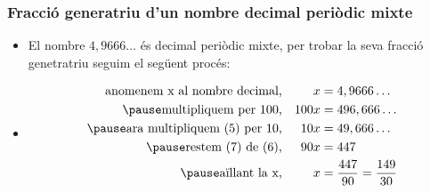 \documentclass{beamer}
\begin{document}
\begin{frame}\frametitle{Fracció generatriu d'un nombre decimal periòdic mixte}
\begin{itemize}
\item
El nombre $4,9666\ldots$ és decimal periòdic mixte, per trobar la
seva fracció genetratriu seguim el següent procés:\pause
\end{itemize}
\begin{itemize}
\item[]
\begin{align}
 \text{anomenem x al nombre decimal,}  & &x&=4,9666\ldots \\\pause
\text{multipliquem per 100,}&&100x&= 496,666\ldots \\\pause
\text{ara multipliquem (5) per 10,}&&10x&= 49,666\ldots \\\pause
\text{restem (7) de (6),}& &90x&=447 \\\pause \text{aïllant la x,}
& &x &=\frac{447}{90}=\frac{149}{30}
\end{align}
\end{itemize}
\end{frame}
\end{document}
